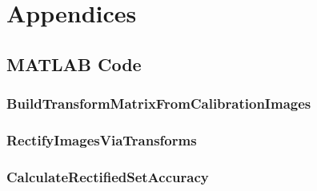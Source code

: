 \documentclass[../main.tex]{subfiles}
\begin{document}
\section{Appendices} 


\subsection{MATLAB Code}
\subsubsection{BuildTransformMatrixFromCalibrationImages} \label{apx:matlab-build-transforms}


\subsubsection{RectifyImagesViaTransforms} \label{apx:matlab-rectify-images}


\newpage
\subsubsection{CalculateRectifiedSetAccuracy} \label{apx:rectified-set-accuracy}




\end{document}

